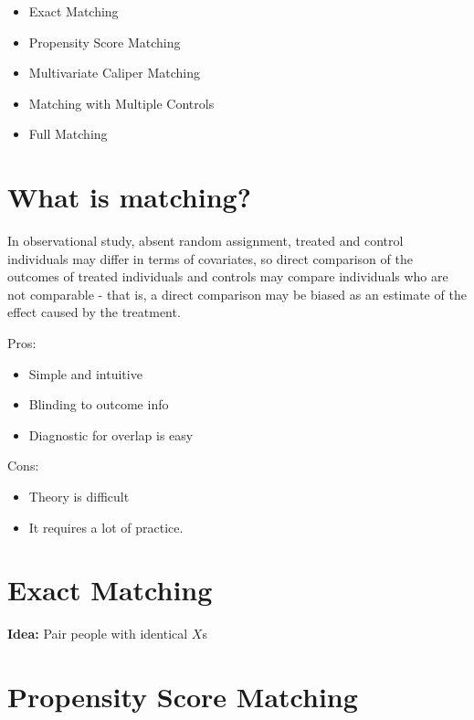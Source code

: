 \documentclass[
]{book}
\providecommand{\tightlist}{%
  \setlength{\itemsep}{0pt}\setlength{\parskip}{0pt}}
\begin{document}
\begin{itemize}
\tightlist
\item
  Exact Matching
\item
  Propensity Score Matching
\item
  Multivariate Caliper Matching
\item
  Matching with Multiple Controls
\item
  Full Matching
\end{itemize}

\hypertarget{what-is-matching}{%
\section{What is matching?}\label{what-is-matching}}

In observational study, absent random assignment, treated and control individuals may differ in terms of covariates, so direct comparison of the outcomes of treated individuals and controls may compare individuals who are not comparable - that is, a direct comparison may be biased as an estimate of the effect caused by the treatment.

Pros:

\begin{itemize}
\tightlist
\item
  Simple and intuitive
\item
  Blinding to outcome info
\item
  Diagnostic for overlap is easy
\end{itemize}

Cons:

\begin{itemize}
\tightlist
\item
  Theory is difficult
\item
  It requires a lot of practice.
\end{itemize}

\hypertarget{exact-matching}{%
\section{Exact Matching}\label{exact-matching}}

\textbf{Idea:} Pair people with identical \(X\)s

\hypertarget{propensity-score-matching}{%
\section{Propensity Score Matching}\label{propensity-score-matching}}
\end{document}
